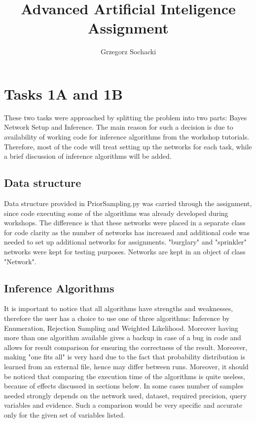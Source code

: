 \documentclass[10pt]{article}
\title {Advanced Artificial Inteligence Assignment }
\author{Grzegorz Sochacki \\}
\begin{document}
\maketitle

\newpage

\tableofcontents{}

\newpage

\section{Tasks 1A and 1B}
These two tasks were approached by splitting the problem into two parts: Bayes Network Setup and Inference. The main reason for such a decision is due to availability of working code for inference algorithms from the workshop tutorials. Therefore, most of the code will treat setting up the networks for each task, while a brief discussion of inference algorithms will be added.

\subsection{Data structure}
Data structure provided in PriorSampling.py \citep{PriorSampling} was carried through the assignment, since code executing some of the algorithms was already developed during workshops. The difference is that these networks were placed in a separate class for code clarity as the number of networks has increased and additional code was needed to set up additional networks for assignments. "burglary" and "sprinkler" networks were kept for testing purposes. Networks are kept in an object of class "Network".

\subsection{Inference Algorithms}
It is important to notice that all algorithms have strengths and weaknesses, therefore the user has a choice to use one of three algorithms: Inference by Enumeration, Rejection Sampling and Weighted Likelihood. Moreover having more than one algorithm available gives a backup in case of a bug in code and allows for result comparison for ensuring the correctness of the result. Moreover, making "one fits all" is very hard due to the fact that probability distribution is learned from an external file, hence may differ between runs. Moreover, it should be noticed that comparing the execution time of the algorithms is quite useless, because of effects discussed in sections below. In some cases number of samples needed strongly depends on the network used, dataset, required precision, query variables and evidence. Such a comparison would be very specific and accurate only for the given set of variables listed.
\end{document}

